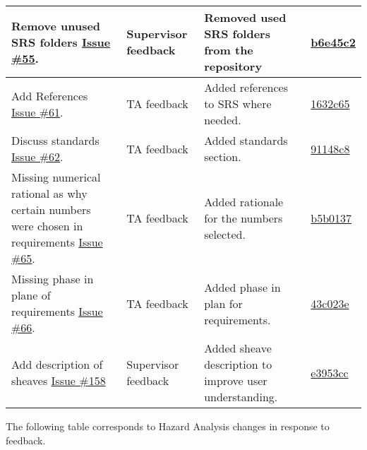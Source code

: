 \documentclass{article}
\begin{document}
\begin{longtable}{|p{4cm}|p{1.5cm}|p{4cm}|p{1.5cm}|}
    \hline 
    Remove unused SRS folders \href{https://github.com/gr812b/CVT-Simulator/issues/55}{Issue \#55}. & Supervisor feedback & Removed used SRS folders from the repository & 
    \href{https://github.com/gr812b/CVT-Simulator/commit/b6e45c22301071eea9360af5a45d437670bcf9a7}{b6e45c2}  \\
    \hline
    Add References \href{https://github.com/gr812b/CVT-Simulator/issues/61}{Issue \#61}. & TA feedback & Added references to SRS where needed. & 
    \href{https://github.com/gr812b/CVT-Simulator/commit/1632c65edd88ce7af866c39e77177310d6423657}{1632c65}  \\
    \hline 
    Discuss standards \href{https://github.com/gr812b/CVT-Simulator/issues/62}{Issue \#62}. & TA feedback & Added standards section. & 
    \href{https://github.com/gr812b/CVT-Simulator/commit/91148c8a8249d9964023fbcab5e4fcf92a940b2c}{91148c8} \\
    \hline
    Missing numerical rational as why certain numbers were chosen in requirements \href{https://github.com/gr812b/CVT-Simulator/issues/65}{Issue \#65}. & TA feedback & Added rationale for the numbers selected. & 
    \href{https://github.com/gr812b/CVT-Simulator/commit/b5b01370c77954ad1f6c25786c1e88eb61ef5a77}{b5b0137} \\
    \hline
    Missing phase in plane of requirements \href{https://github.com/gr812b/CVT-Simulator/issues/66}{Issue \#66}. & TA feedback & Added phase in plan for requirements. & 
    \href{https://github.com/gr812b/CVT-Simulator/commit/43c023e165f82a2f03926e7721ca326effeb52e47}{43c023e} \\
    \hline
    Add description of sheaves \href{https://github.com/gr812b/CVT-Simulator/issues/158}{Issue \#158} & Supervisor feedback & Added sheave description to improve user understanding. & 
    \href{https://github.com/gr812b/CVT-Simulator/commit/e3953ccd60abfd192f6ebd23efa01e5a88108d30}{e3953cc}
    \end{longtable}


    \noindent The following table corresponds to Hazard Analysis changes in response to feedback.
\end{document}
